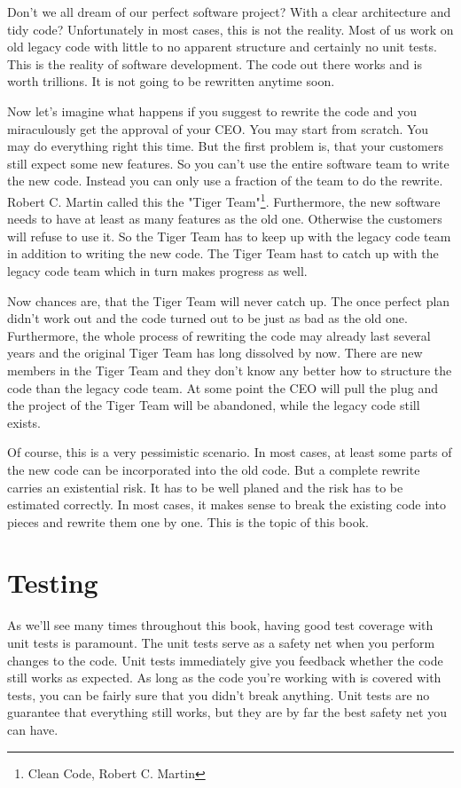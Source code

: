 Don't we all dream of our perfect software project? With a clear architecture and tidy code? Unfortunately in most cases, this is not the reality. Most of us work on old legacy code with little to no apparent structure and certainly no unit tests. This is the reality of software development. The code out there works and is worth trillions. It is not going to be rewritten anytime soon.

Now let's imagine what happens if you suggest to rewrite the code and you miraculously get the approval of your CEO. You may start from scratch. You may do everything right this time. But the first problem is, that your customers still expect some new features. So you can't use the entire software team to write the new code. Instead you can only use a fraction of the team to do the rewrite. Robert C. Martin called this the "Tiger Team"\footnote{Clean Code, Robert C. Martin}. Furthermore, the new software needs to have at least as many features as the old one. Otherwise the customers will refuse to use it. So the Tiger Team has to keep up with the legacy code team in addition to writing the new code. The Tiger Team hast to catch up with the legacy code team which in turn makes progress as well.

Now chances are, that the Tiger Team will never catch up. The once perfect plan didn't work out and the code turned out to be just as bad as the old one. Furthermore, the whole process of rewriting the code may already last several years and the original Tiger Team has long dissolved by now. There are new members in the Tiger Team and they don't know any better how to structure the code than the legacy code team. At some point the CEO will pull the plug and the project of the Tiger Team will be abandoned, while the legacy code still exists.

Of course, this is a very pessimistic scenario. In most cases, at least some parts of the new code can be incorporated into the old code. But a complete rewrite carries an existential risk. It has to be well planed and the risk has to be estimated correctly. In most cases, it makes sense to break the existing code into pieces and rewrite them one by one. This is the topic of this book.

\chapter{Testing}

As we'll see many times throughout this book, having good test coverage with unit tests is paramount. The unit tests serve as a safety net when you perform changes to the code. Unit tests immediately give you feedback whether the code still works as expected. As long as the code you're working with is covered with tests, you can be fairly sure that you didn't break anything. Unit tests are no guarantee that everything still works, but they are by far the best safety net you can have.

